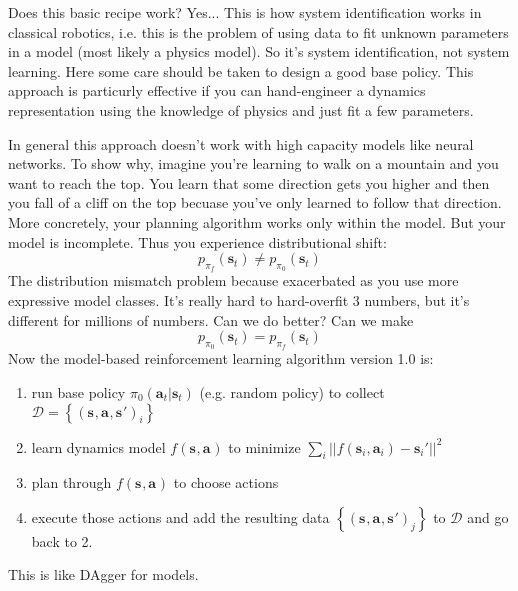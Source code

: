 \documentclass{report}
\begin{document}
Does this basic recipe work? Yes...
This is how system identification works in classical robotics, i.e.
this is the problem of using data to fit unknown parameters in a model (most likely a physics model).
So it's system identification, not system learning.
Here some care should be taken to design a good base policy.
This approach is particurly effective if you can hand-engineer a dynamics representation using
the knowledge of physics and just fit a few parameters.

In general this approach doesn't work with high capacity models like neural networks.
To show why, imagine you're learning to walk on a mountain and you want to reach the top.
You learn that some direction gets you higher and then you fall of a cliff on the top becuase you've only
learned to follow that direction.
More concretely, your planning algorithm works only within the model. But your model is incomplete.
Thus you experience distributional shift:
\begin{equation}
		p_{\pi_f} (\bm{s}_{t}) \neq p_{\pi_0} (\bm{s}_{t})
\end{equation}
The distribution mismatch problem because exacerbated as you use more expressive model classes.
It's really hard to hard-overfit 3 numbers, but it's different for millions of numbers.
Can we do better? Can we make
\begin{equation}
		p_{\pi_0} (\bm{s}_{t}) = p_{\pi_f} (\bm{s}_{t})
\end{equation}
Now the model-based reinforcement learning algorithm version 1.0 is:
\begin{enumerate}
		\item run base policy $ \pi_0 (\bm{a}_t| \bm{s}_t)  $ (e.g. random policy) to collect $ \mathcal{D} = \left\{ \left( \bm{s}_{}, \bm{a}_{}, \bm{s}_{}' \right)_i  \right\}  $ 
		\item learn dynamics model $f(\bm{s}_{}, \bm{a}_{})$ to minimize $ \sum_{i}^{} || f (\bm{s}_{i}, \bm{a}_{i} ) - \bm{s}_{i}'||^2$ 
		\item plan through $f(\bm{s}_{}, \bm{a}_{})$ to choose actions
		\item execute those actions and add the resulting data $\left\{ \left( \bm{s}_{}, \bm{a}_{}, \bm{s}_{}' \right)_j  \right\}  $ to $\mathcal{D}$ and go back to 2.
\end{enumerate}
This is like DAgger for models.
\end{document}
